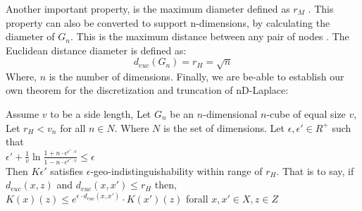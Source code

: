 Another important property, is the maximum diameter defined as $r_M$ \citep{9646489}.
This property can also be converted to support n-dimensions, by calculating the diameter of $G_n$.
This is the maximum distance between any pair of nodes \citep{HARARY1988277}. \newline
The Euclidean distance diameter is defined as:
\begin{equation}
  d_{euc}(G_n) = r_H = \sqrt{n}
\end{equation}
Where, $n$ is the number of dimensions. \newpage
Finally, we are be-able to establish our own theorem for the discretization and truncation of nD-Laplace:
\begin{theorem}
Assume $v$ to be a side length, Let $G_n$ be an $n$-dimensional $n$-cube of equal size $v$, Let $r_H < v_n$  for all $n \in N$. Where $N$ is the set of dimensions. Let $\epsilon, \epsilon' \in R^+$ such that \\
  $\epsilon' + \frac{1}{v} \ln \frac{1 + n \cdot e^{\epsilon' \cdot v}}{1 - n \cdot e^{\epsilon' \cdot v}} \leq \epsilon$ \\
  Then $K\epsilon'$ satisfies $\epsilon$-geo-indistinguishability within range
  of $r_H$. That is to say, if $d_{euc}(x, z)$ and $d_{euc}(x, x') \leq r_H$ then, \\
  $K(x)(z) \leq e^{\epsilon \cdot d_{euc} (x, x')} \cdot K(x')(z)$ forall $x, x' \in X, z \in Z$ \citep{chatzikokolakis_constructing_2015} 
\end{theorem}


